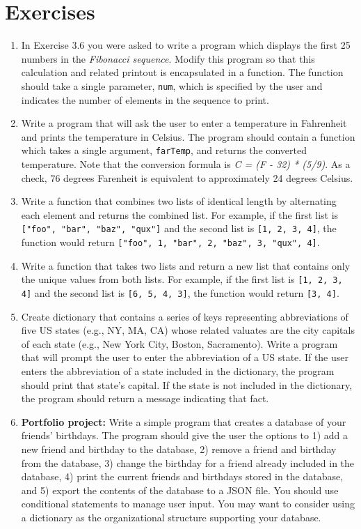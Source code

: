 \documentclass{book}
\begin{document}
\section{Exercises}
\begin{enumerate}
	\item In Exercise 3.6 you were asked to write a program which displays the first 25 numbers in the \textit{Fibonacci sequence}. Modify this program so that this calculation and related printout is encapsulated in a function. The function should take a single parameter, \texttt{num}, which is specified by the user and indicates the number of elements in the sequence to print. 
	
	\item Write a program that will ask the user to enter a temperature in Fahrenheit and prints the temperature in Celsius. The program should contain a function which takes a single argument, \texttt{farTemp}, and returns the converted temperature. Note that the conversion formula is \textit{C = (F - 32) * (5/9)}. As a check, 76 degrees Farenheit is equivalent to approximately 24 degrees Celsius.
	
	\item Write a function that combines two lists of identical length by alternating each element and returns the combined list. For example, if the first list is \texttt{["foo", "bar", "baz", "qux"]} and the second list is \texttt{[1, 2, 3, 4]}, the function would return \texttt{["foo", 1, "bar", 2, "baz", 3, "qux", 4]}.
	
	\item Write a function that takes two lists and return a new list that contains only the unique values from both lists. For example, if the first list is \texttt{[1, 2, 3, 4]} and the second list is \texttt{[6, 5, 4, 3]}, the function would return \texttt{[3, 4]}.
	
	\item Create dictionary that contains a series of keys representing abbreviations of five US states (e.g., NY, MA, CA) whose related valuates are the city capitals of each state (e.g., New York City, Boston, Sacramento). Write a program that will prompt the user to enter the abbreviation of a US state. If the user enters the abbreviation of a state included in the dictionary, the program should print that state's capital. If the state is not included in the dictionary, the program should return a message indicating that fact.
	
	\item \textbf{Portfolio project:} Write a simple program that creates a database of your friends' birthdays. The program should give the user the options to 1) add a new friend and birthday to the database, 2) remove a friend and birthday from the database, 3) change the birthday for a friend already included in the database, 4) print the current friends and birthdays stored in the database, and 5) export the contents of the database to a JSON file. You should use conditional statements to manage user input. You may want to consider using a dictionary as the organizational structure supporting your database.
	

\end{enumerate}
\end{document}
